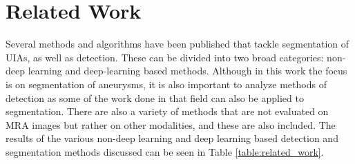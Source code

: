 \chapter{Related Work}
\label{chapter2}

Several methods and algorithms have been published that tackle segmentation of UIAs, as well as detection. These can be divided into two broad categories: non-deep learning and deep-learning based methods. Although in this work the focus is on segmentation of aneurysms, it is also important to analyze methods of detection as some of the work done in that field can also be applied to segmentation. There are also a variety of methods that are not evaluated on MRA images but rather on other modalities, and these are also included. The results of the various non-deep learning and deep learning based detection and segmentation methods discussed can be seen in Table \ref{table:related_work}.

